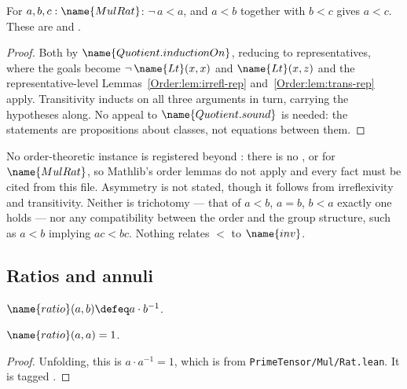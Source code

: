 \begin{theorem}\label{Order:thm:strict}
For $a, b, c : \name{MulRat}$: $\neg\, a < a$, and $a < b$ together with
$b < c$ gives $a < c$.  These are  and
.
\end{theorem}

\begin{proof}
Both by $\name{Quotient.inductionOn}$, reducing to representatives, where the
goals become $\neg\,\name{Lt}(x,x)$ and $\name{Lt}(x,z)$ and the
representative-level Lemmas~\ref{Order:lem:irrefl-rep}
and~\ref{Order:lem:trans-rep} apply.  Transitivity inducts on all three
arguments in turn, carrying the hypotheses along.  No appeal to
$\name{Quotient.sound}$ is needed: the statements are propositions about
classes, not equations between them.
\end{proof}

\begin{remark}\label{Order:rem:order-gaps}
No order-theoretic instance is registered beyond : there is no
,  or  for
$\name{MulRat}$, so Mathlib's order lemmas do not apply and every fact must be
cited from this file.  Asymmetry is not stated, though it follows from
irreflexivity and transitivity.  Neither is trichotomy --- that of $a < b$,
$a = b$, $b < a$ exactly one holds --- nor any compatibility between the order
and the group structure, such as $a < b$ implying $ac < bc$.  Nothing relates
$<$ to $\name{inv}$.
\end{remark}

\subsection{Ratios and annuli}

\begin{definition}\label{Order:def:ratio}
$\name{ratio}(a,b) \defeq a \cdot b^{-1}$.
\end{definition}

\begin{lemma}\label{Order:lem:ratio-self}
$\name{ratio}(a,a) = 1$.
\end{lemma}

\begin{proof}
Unfolding, this is $a \cdot a^{-1} = 1$, which is  from
\texttt{PrimeTensor/Mul/Rat.lean}.  It is tagged .
\end{proof}

